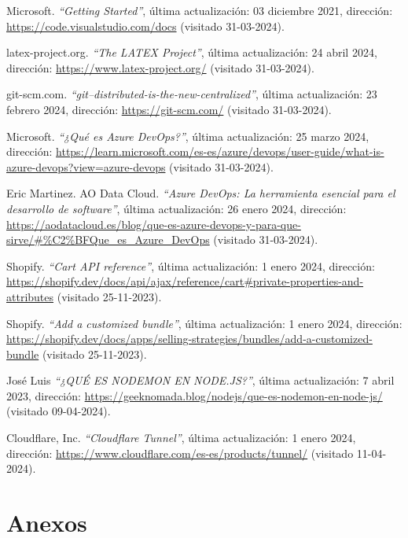 \documentclass[12pt]{article}
\begin{document}
\begin{thebibliography}{100}
    Microsoft.
    \textit{``Getting Started''}, última actualización: 03 diciembre 2021, dirección: \url{https://code.visualstudio.com/docs} (visitado 31-03-2024).

    latex-project.org.
    \textit{``The LATEX Project''}, última actualización: 24 abril 2024, dirección: \url{https://www.latex-project.org/} (visitado 31-03-2024).

    git-scm.com.
    \textit{``git--distributed-is-the-new-centralized''}, última actualización: 23 febrero 2024, dirección: \url{https://git-scm.com/} (visitado 31-03-2024).

    Microsoft.
    \textit{``¿Qué es Azure DevOps?''}, última actualización: 25 marzo 2024, dirección: \url{https://learn.microsoft.com/es-es/azure/devops/user-guide/what-is-azure-devops?view=azure-devops} (visitado 31-03-2024).

    Eric Martinez. AO Data Cloud.
    \textit{``Azure DevOps: La herramienta esencial para el desarrollo de software''}, última actualización: 26 enero 2024, dirección: \url{https://aodatacloud.es/blog/que-es-azure-devops-y-para-que-sirve/#%C2%BFQue_es_Azure_DevOps} (visitado 31-03-2024).

    Shopify.
    \textit{``Cart API reference''}, última actualización: 1 enero 2024, dirección: \url{https://shopify.dev/docs/api/ajax/reference/cart#private-properties-and-attributes} (visitado 25-11-2023).

    Shopify.
    \textit{``Add a customized bundle''}, última actualización: 1 enero 2024, dirección: \url{https://shopify.dev/docs/apps/selling-strategies/bundles/add-a-customized-bundle} (visitado 25-11-2023).

    José Luis
    \textit{``¿QUÉ ES NODEMON EN NODE.JS?''}, última actualización: 7 abril 2023, dirección: \url{https://geeknomada.blog/nodejs/que-es-nodemon-en-node-js/} (visitado 09-04-2024).

    Cloudflare, Inc.
    \textit{``Cloudflare Tunnel''}, última actualización: 1 enero 2024, dirección: \url{https://www.cloudflare.com/es-es/products/tunnel/} (visitado 11-04-2024).

\end{thebibliography}

\clearpage
\section{Anexos}
\end{document}
